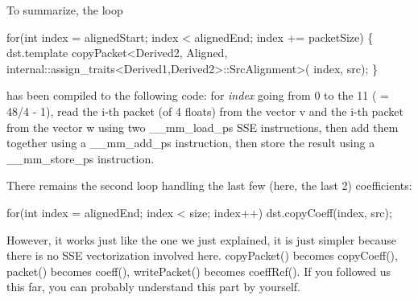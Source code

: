 To summarize, the loop 
\begin{DoxyCode}
\textcolor{keywordflow}{for}(\textcolor{keywordtype}{int} index = alignedStart; index < alignedEnd; index += packetSize)
\{
  dst.template copyPacket<Derived2, Aligned, internal::assign\_traits<Derived1,Derived2>::SrcAlignment>(
      index, src);
\}
\end{DoxyCode}
 has been compiled to the following code\+: for {\itshape index} going from 0 to the 11 ( = 48/4 -\/ 1), read the i-\/th packet (of 4 floats) from the vector v and the i-\/th packet from the vector w using two \+\_\+\+\_\+mm\+\_\+load\+\_\+ps S\+SE instructions, then add them together using a \+\_\+\+\_\+mm\+\_\+add\+\_\+ps instruction, then store the result using a \+\_\+\+\_\+mm\+\_\+store\+\_\+ps instruction.

There remains the second loop handling the last few (here, the last 2) coefficients\+: 
\begin{DoxyCode}
\textcolor{keywordflow}{for}(\textcolor{keywordtype}{int} index = alignedEnd; index < size; index++)
  dst.copyCoeff(index, src);
\end{DoxyCode}
 However, it works just like the one we just explained, it is just simpler because there is no S\+SE vectorization involved here. copy\+Packet() becomes copy\+Coeff(), packet() becomes coeff(), write\+Packet() becomes coeff\+Ref(). If you followed us this far, you can probably understand this part by yourself.

